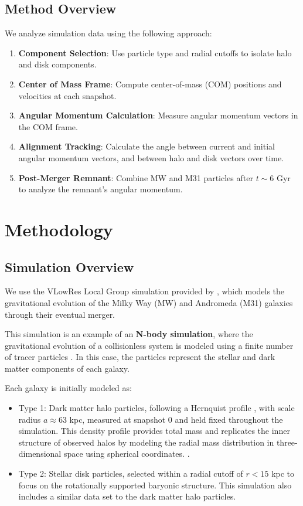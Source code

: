\documentclass[twocolumn]{aastex631}
\begin{document}
\subsection{Method Overview}

We analyze simulation data using the following approach:

\begin{enumerate}
    \item \textbf{Component Selection}: Use particle type and radial cutoffs to isolate halo and disk components.
    \item \textbf{Center of Mass Frame}: Compute center-of-mass (COM) positions and velocities at each snapshot.
    \item \textbf{Angular Momentum Calculation}: Measure angular momentum vectors in the COM frame.
    \item \textbf{Alignment Tracking}: Calculate the angle between current and initial angular momentum vectors, and between halo and disk vectors over time.
    \item \textbf{Post-Merger Remnant}: Combine MW and M31 particles after $t \sim 6$ Gyr to analyze the remnant’s angular momentum.
\end{enumerate}

\section{Methodology}

\subsection{Simulation Overview}

We use the VLowRes Local Group simulation provided by \cite{vanderMarel2012}, which models the gravitational evolution of the Milky Way (MW) and Andromeda (M31) galaxies through their eventual merger.


This simulation is an example of an \textbf{N-body simulation}, where the gravitational evolution of a collisionless system is modeled using a finite number of tracer particles \citep{Springel2005}. In this case, the particles represent the stellar and dark matter components of each galaxy.

Each galaxy is initially modeled as:
\begin{itemize}
    \item Type 1: Dark matter halo particles, following a Hernquist profile \citep{Hernquist1990}, with scale radius $a \approx 63$ kpc, measured at snapshot 0 and held fixed throughout the simulation. This density profile provides total mass and replicates the inner structure of observed halos by modeling the radial mass distribution in three-dimensional space using spherical coordinates.
.
    \item Type 2: Stellar disk particles, selected within a radial cutoff of $r < 15$ kpc to focus on the rotationally supported baryonic structure. This simulation also includes a similar data set to the dark matter halo particles.
\end{itemize}
\end{document}

